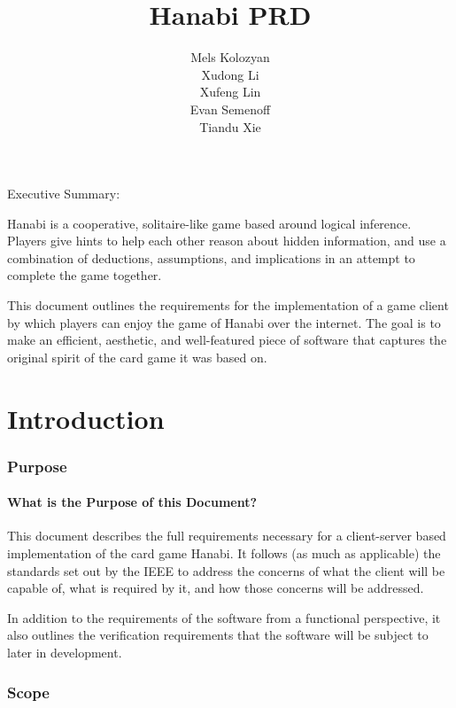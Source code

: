 \documentclass[12pt]{article}
\title{\textbf{Hanabi PRD}}
\author{Mels Kolozyan\\
		Xudong Li\\
		Xufeng Lin\\
		Evan Semenoff\\
		Tiandu Xie\\
		}
\date{}
\begin{document}
\maketitle
\newpage
\tableofcontents

\newpage

\begin{center}

\large{Executive Summary:}
\end{center}

Hanabi is a cooperative, solitaire-like game based around logical inference.
Players give hints to help each other reason about hidden information, and use a
combination of deductions, assumptions, and implications in an attempt to complete
the game together.

This document outlines the requirements for the implementation of a game client
by which players can enjoy the game of Hanabi over the internet.  The goal is to make
an efficient, aesthetic, and well-featured piece of software that captures the
original spirit of the card game it was based on.


\newpage


\part{Introduction}

\section{Purpose}
\subsection{What is the Purpose of this Document?}

This document describes the full requirements necessary for a client-server
based implementation of the card game Hanabi.  It follows (as much as
applicable) the standards set out by the IEEE to address the concerns of what
the client will be capable of, what is required by it, and how those concerns
will be addressed.

In addition to the requirements of the software from a functional perspective,
it also outlines the verification requirements that the software will be subject
to later in development.

\section{Scope}
\end{document}
